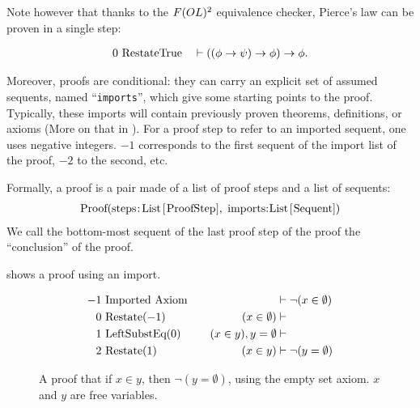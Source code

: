 \noindent
Note however that thanks to the $F(OL)\textsuperscript{2}$ equivalence checker, Pierce's law can be proven in a single step:

\begin{gather*}
  0  ~\text{\lstinline|RestateTrue|}        \quad \vdash ((\phi \to \psi) \to \phi) \to \phi .
\end{gather*}

Moreover, proofs are conditional: they can carry an explicit set of assumed sequents, named ``\lstinline|imports|'', which give some starting points to the proof. Typically, these imports will contain previously proven theorems, definitions, or axioms (More on that in ). For a proof step to refer to an imported sequent, one uses negative integers. $-1$ corresponds to the first sequent of the import list of the proof, $-2$ to the second, etc.

Formally, a proof is a pair made of a list of proof steps and a list of sequents:
%
\begin{gather*}
  \text{\lstinline|Proof(steps:List[ProofStep], imports:List[Sequent])|}
\end{gather*}
%
We call the bottom-most sequent of the last proof step of the proof the ``conclusion'' of the proof.

\noindent
{} shows a proof using an import.
%
\begin{figure}[ht]
  \begin{align*}
    -1 & ~\text{\lstinline|Imported Axiom|} & \quad                         & \vdash \neg (x \in \emptyset) \\
    0  & ~\text{\lstinline|Restate|}(-1)    & \quad  (x \in \emptyset)      & \vdash                        \\
    1  & ~\text{\lstinline|LeftSubstEq|}(0) & \quad  (x \in y), y=\emptyset & \vdash                        \\
    2  & ~\text{\lstinline|Restate|}(1)     & \quad  (x \in y)              & \vdash \neg(y=\emptyset)
  \end{align*}
  \caption{A proof that if $x\in y$, then $\neg (y=\emptyset)$, using the empty set axiom. $x$ and $y$ are free variables.}
  \label{fig:exampleProofImports}
\end{figure}

